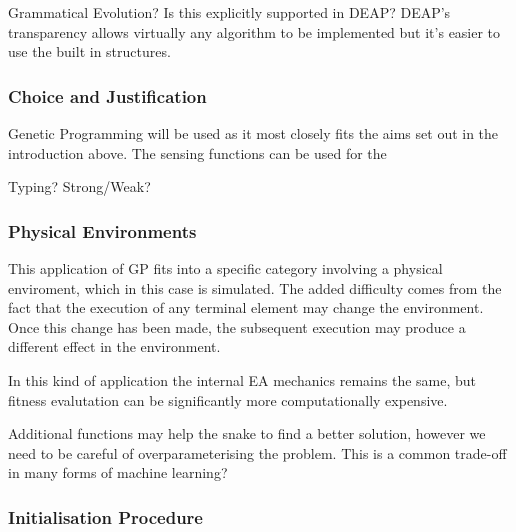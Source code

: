 \documentclass{article}
\begin{document}
Grammatical Evolution? Is this explicitly supported in DEAP?\cite{deap}
DEAP's transparency allows virtually any algorithm to be implemented but it's easier to use the built in structures.



\subsubsection{Choice and Justification}
Genetic Programming will be used as it most closely fits the aims set out in the introduction above. The sensing functions can be used for the 

Typing? Strong/Weak?

\subsubsection{Physical Environments}
This application of GP fits into a specific category involving a physical enviroment, which in this case is simulated. The added difficulty comes from the fact that the execution of any terminal element may change the environment. Once this change has been made, the subsequent execution may produce a different effect in the environment. %

In this kind of application the internal EA mechanics remains the same, but fitness evalutation can be significantly more computationally expensive.\cite[p. 110]{textbook}

Additional functions may help the snake to find a better solution, however we need to be careful of overparameterising the problem.
This is a common trade-off in many forms of machine learning?

\subsubsection{Initialisation Procedure}
\end{document}
